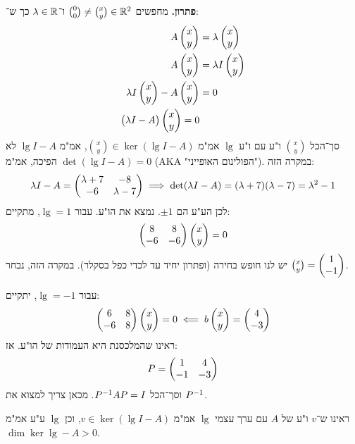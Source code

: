 \documentclass[name=רשימות אלגברה לינארית 2א]{../../../tex/classes/megasumPreamble}
\begin{document}
	\textbf{פתרון. }מחפשים $\binom{0}{0} \neq \binom{x}{y} \in \mathbb{R}^2$ ו־$\lambda \in \mathbb{R}$ כך ש־: 
	\begin{align*}
		A\begin{pmatrix} x \\ y \end{pmatrix} &= \lambda \begin{pmatrix} x \\ y \end{pmatrix} \\
		A\begin{pmatrix} x \\ y \end{pmatrix} &= \lambda I \begin{pmatrix} x \\ y \end{pmatrix} \\
		\lambda I \begin{pmatrix} x \\ y \end{pmatrix} - A \begin{pmatrix} x \\ y \end{pmatrix} &= 0 \\
		\begin{pmatrix} \lambda I - A \end{pmatrix} \begin{pmatrix} x \\ y \end{pmatrix} = 0
	\end{align*}
	סך־הכל $\binom{x}{y}$ ו"ע עם ו"ע $\lg$ אמ"מ $\binom{x}{y} \in \ker (\lg I - A)$, אמ"מ $\lg I - A$ לא הפיכה, אמ"מ $\det(\lg I - A) = 0$ (AKA "הפולינום האופייני"). במקרה הזה: 
	\[ \lambda I - A = \begin{pmatrix} \lambda + 7 & -8 \\ -6 & \lambda - 7 \end{pmatrix} \implies \det(\lambda I - A) = (\lambda + 7)(\lambda - 7) = \lambda^2 - 1 \]
	לכן הע"ע הם $\pm 1$. נמצא את הו"ע. עבור $\lg = 1$, מתקיים: 
	\[ \begin{pmatrix} 8 & 8 \\ -6 & -6 \end{pmatrix}\begin{pmatrix} x \\ y \end{pmatrix} = 0 \]
	יש לנו חופש בחירה (ופתרון יחיד עד לכדי כפל בסקלר). במקרה הזה, נבחר $\binom{x}{y} = \begin{pmatrix} 1 \\ -1 \end{pmatrix}$. 
	
	עבור $\lg = -1$, יתקיים: 
	\[ \begin{pmatrix} 6 & 8 \\ -6 & 8 \end{pmatrix}\begin{pmatrix} x \\ y \end{pmatrix} = 0 \impliedby b\begin{pmatrix} x \\ y \end{pmatrix} = \begin{pmatrix} 4 \\ -3 \end{pmatrix} \]
	ראינו שהמלכסנת היא העמודות של הו"ע. אז: 
	\[ P = \begin{pmatrix} 1 & 4 \\ -1 & -3 \end{pmatrix} \]
	וסך־הכל $P^{-1} A P = I$. מכאן צריך למצוא את $P^{-1}$. 
	
	
	
	
	ראינו ש־$v$ ו"ע של $A$ עם ערך עצמי $\lg$ אמ"מ $v \in \ker(\lg I - A)$, וכן $\lg$ ע"ע אמ"מ $\dim \ker \lg - A > 0$. 
	
	
	\renewcommand{\footrule}{\rule{\linewidth-26pt}{0.25pt}\vspace{-5pt}}
	
\end{document}
